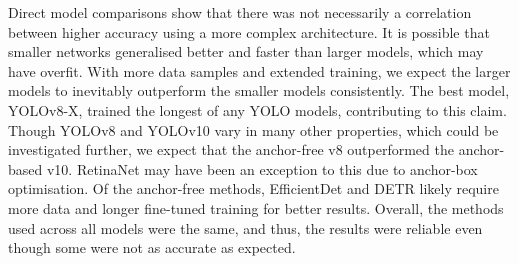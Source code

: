 Direct model comparisons show that there was not necessarily a correlation between higher accuracy using a more complex architecture. It is possible that smaller networks generalised better and faster than larger models, which may have overfit. With more data samples and extended training, we expect the larger models to inevitably outperform the smaller models consistently. The best model, YOLOv8-X, trained the longest of any YOLO models, contributing to this claim. Though YOLOv8 and YOLOv10 vary in many other properties, which could be investigated further, we expect that the anchor-free v8 outperformed the anchor-based v10. RetinaNet may have been an exception to this due to anchor-box optimisation. Of the anchor-free methods, EfficientDet and DETR likely require more data and longer fine-tuned training for better results. Overall, the methods used across all models were the same, and thus, the results were reliable even though some were not as accurate as expected. 

